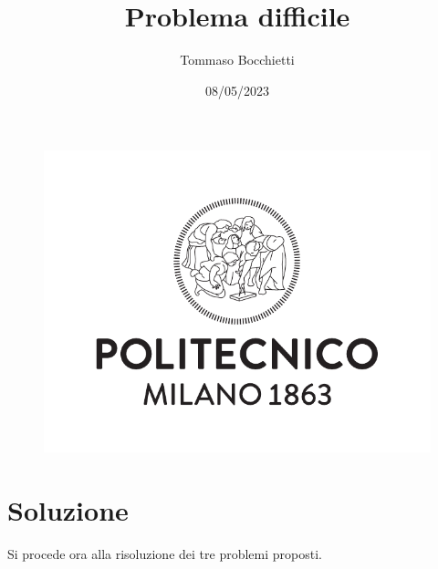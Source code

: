 \documentclass[a4paper, 12pt]{article}
\title{Problema difficile}
\author{Tommaso Bocchietti}
\date{08/05/2023}
\begin{document}
\begin{figure}
    \centering
    \includegraphics[width=.9\textwidth]{logo_polimi}
\end{figure}

\maketitle

\clearpage

\tableofcontents
\pagebreak



\pagebreak

\section{Soluzione}
Si procede ora alla risoluzione dei tre problemi proposti.






\end{document}
